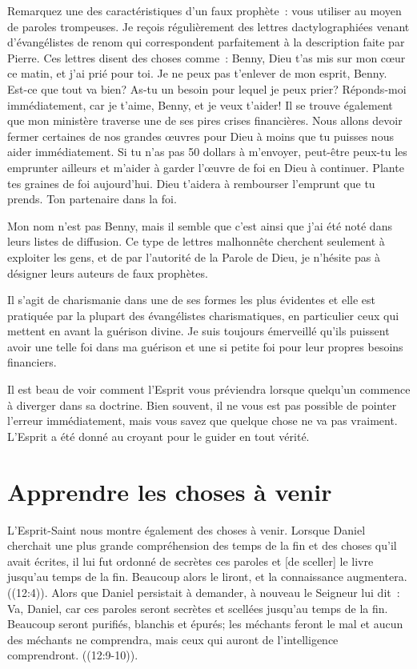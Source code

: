 Remarquez une des caractéristiques d'un faux prophète~:
 \og vous utiliser au moyen de paroles trompeuses. \fg{}
 Je reçois régulièrement des lettres dactylographiées
 venant d'évangélistes de renom qui correspondent parfaitement
 à la description faite par Pierre.
 Ces lettres disent des choses comme~:
 \og Benny, Dieu t'as mis sur mon cœur ce matin, et j'ai prié pour toi.
 Je ne peux pas t'enlever de mon esprit, Benny.
 Est-ce que tout va bien? As-tu un besoin pour lequel je peux prier?
 Réponds-moi immédiatement, car je t'aime, Benny, et je veux t'aider!
 Il se trouve également que mon ministère traverse
 une de ses pires crises financières.
 Nous allons devoir fermer certaines de nos grandes œuvres pour Dieu
 à moins que tu puisses nous aider immédiatement.
 Si tu n'as pas 50 dollars à m'envoyer, peut-être peux-tu les emprunter
 ailleurs et m'aider à garder l'œuvre de foi en Dieu à continuer.
 Plante tes graines de foi aujourd'hui.
 Dieu t'aidera à rembourser l'emprunt que tu prends.
 Ton partenaire dans la foi. \fg{}

Mon nom n'est pas Benny, mais il semble que c'est ainsi que j'ai été noté
 dans leurs listes de diffusion.
 Ce type de lettres malhonnête cherchent seulement à exploiter les gens,
 et de par l'autorité de la Parole de Dieu,
 je n'hésite pas à désigner leurs auteurs de faux prophètes.

Il s'agit de charismanie dans une de ses formes les plus évidentes
 et elle est pratiquée par la plupart des évangélistes charismatiques,
 en particulier ceux qui mettent en avant la guérison divine.
 Je suis toujours émerveillé qu'ils puissent avoir une telle foi
 dans ma guérison et une si petite foi pour leur propres besoins financiers.

Il est beau de voir comment l'Esprit vous préviendra
 lorsque quelqu'un commence à diverger dans sa doctrine.
 Bien souvent, il ne vous est pas possible de pointer l'erreur immédiatement,
 mais vous savez que quelque chose ne va pas vraiment.
 L'Esprit a été donné au croyant pour le guider en tout vérité.


\section*{Apprendre les choses à venir}

L'Esprit-Saint nous montre également des choses à venir.
 Lorsque Daniel cherchait une plus grande compréhension des temps de la fin
 et des choses qu'il avait écrites, il lui fut ordonné de
 \og [tenir] secrètes ces paroles et [de sceller] le livre
 jusqu'au temps de la fin.
 Beaucoup alors le liront, et la connaissance augmentera. \fg{}
 ((12:4)).
 Alors que Daniel persistait à demander, à nouveau le Seigneur lui dit~:
 \og Va, Daniel, car ces paroles seront secrètes
 et scellées jusqu'au temps de la fin.
 Beaucoup seront purifiés, blanchis et épurés;
 les méchants feront le mal et aucun des méchants ne comprendra,
 mais ceux qui auront de l'intelligence comprendront. \fg{}
 ((12:9-10)).

